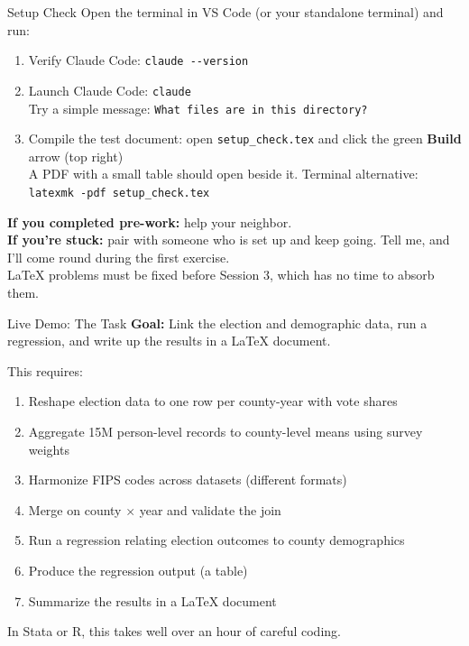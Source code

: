 \documentclass[aspectratio=169, 11pt]{beamer}
\begin{document}
\begin{frame}{Setup Check}
  Open the terminal in VS Code (or your standalone terminal) and run:

  \vspace{0.5em}
  \begin{enumerate}
    \item Verify Claude Code: \lstinline{claude --version}
    \item Launch Claude Code: \lstinline{claude}\\
      {\small Try a simple message: \lstinline{What files are in this directory?}}
    \item Compile the test document: open \texttt{setup\_check.tex} and click the green \textbf{Build} arrow (top right)\\
      {\small A PDF with a small table should open beside it. Terminal alternative: \lstinline{latexmk -pdf setup_check.tex}}
  \end{enumerate}

  \vspace{1em}
  \textbf{If you completed pre-work:} help your neighbor.\\
  \textbf{If you're stuck:} pair with someone who is set up and keep going. Tell me, and I'll come round during the first exercise.\\
  {\small \LaTeX{} problems must be fixed before Session 3, which has no time to absorb them.}
\end{frame}


\begin{frame}{Live Demo: The Task}
  \textbf{Goal:} Link the election and demographic data, run a regression, and write up the results in a \LaTeX{} document.

  \vspace{0.5em}
  This requires:
  \begin{enumerate}
    \item Reshape election data to one row per county-year with vote shares
    \item Aggregate 15M person-level records to county-level means using survey weights
    \item Harmonize FIPS codes across datasets (different formats)
    \item Merge on county $\times$ year and validate the join
    \item Run a regression relating election outcomes to county demographics
    \item Produce the regression output (a table)
    \item Summarize the results in a \LaTeX{} document
  \end{enumerate}

  \vspace{0.5em}
  In Stata or R, this takes well over an hour of careful coding.

\end{frame}
\end{document}
